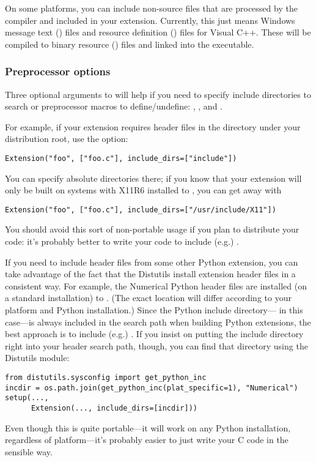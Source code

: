 \documentclass{howto}
\begin{document}

On some platforms, you can include non-source files that are processed
by the compiler and included in your extension.  Currently, this just
means Windows message text () files and resource definition
() files for Visual C++. These will be compiled to binary resource
() files and linked into the executable.


\subsubsection{Preprocessor options}

Three optional arguments to  will help if you need to
specify include directories to search or preprocessor macros to
define/undefine: , , and
.

For example, if your extension requires header files in the
 directory under your distribution root, use the
 option:
\begin{verbatim}
Extension("foo", ["foo.c"], include_dirs=["include"])
\end{verbatim}

You can specify absolute directories there; if you know that your
extension will only be built on \UNIX{} systems with X11R6 installed to
, you can get away with
\begin{verbatim}
Extension("foo", ["foo.c"], include_dirs=["/usr/include/X11"])
\end{verbatim}
You should avoid this sort of non-portable usage if you plan to
distribute your code: it's probably better to write your code to include
(e.g.) .

If you need to include header files from some other Python extension,
you can take advantage of the fact that the Distutils install extension
header files in a consistent way.  For example, the Numerical Python
header files are installed (on a standard \UNIX{} installation) to
.  (The exact location will
differ according to your platform and Python installation.)  Since the
Python include directory--- in this
case---is always included in the search path when building Python
extensions, the best approach is to include (e.g.)
.  If you insist on putting the
 include directory right into your header search path,
though, you can find that directory using the Distutils
 module:
\begin{verbatim}
from distutils.sysconfig import get_python_inc
incdir = os.path.join(get_python_inc(plat_specific=1), "Numerical")
setup(...,
      Extension(..., include_dirs=[incdir]))
\end{verbatim}
Even though this is quite portable---it will work on any Python
installation, regardless of platform---it's probably easier to just
write your C code in the sensible way.
\end{document}
